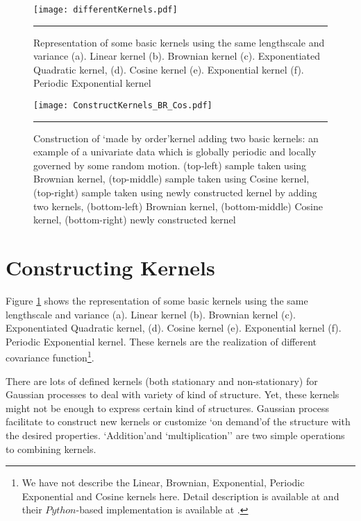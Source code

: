 \begin{figure}[t]
	\centering
		\texttt{[image: differentKernels.pdf]}
		\rule{35em}{0.5pt}
	\caption[Representation of some basic kernels ]
		{Representation of some basic kernels using the same lengthscale and variance (a). Linear kernel (b). Brownian kernel (c). Exponentiated Quadratic kernel, (d). Cosine kernel (e). Exponential kernel (f). Periodic Exponential kernel}
	\label{fig:DifferentKernels}
\end{figure}

\begin{figure}[t]
	\centering
		\texttt{[image: ConstructKernels\_BR\_Cos.pdf]}
		\rule{35em}{0.5pt}
	\caption[Construction of a new kernel adding two basic kernels]
		{Construction of \lq made by order\rq kernel adding two basic kernels: an example of a univariate data which is globally periodic and locally governed by some random motion. (top-left) sample taken using Brownian kernel, (top-middle) sample taken using Cosine kernel, (top-right) sample taken using newly constructed kernel by adding two kernels, (bottom-left) Brownian kernel, (bottom-middle) Cosine kernel, (bottom-right) newly constructed kernel} %
	\label{fig:ConstructKernels_BR_Cos}
\end{figure}

\section{Constructing Kernels}
Figure \ref{fig:DifferentKernels} shows the representation of some basic kernels using the same lengthscale and variance (a). Linear kernel (b). Brownian kernel (c). Exponentiated Quadratic kernel, (d). Cosine kernel (e). Exponential kernel (f). Periodic Exponential kernel. These kernels are the 
realization of different covariance function\footnote{We have not describe the Linear, Brownian, Exponential, Periodic Exponential and Cosine kernels here. Detail description is available at \cite{Rasmussen_and_Williams:2006} and their $Python$-based implementation is available at \cite{gpy2014}.}.

There are lots of defined kernels (both stationary and non-stationary) for Gaussian processes to deal with variety of kind of structure. Yet, these kernels might not be enough to express certain kind of structures. Gaussian process facilitate to construct new kernels or customize \lq on demand\rq of the structure with the desired properties. \lq Addition\rq and \lq multiplication\rq' are two simple operations to combining kernels.

